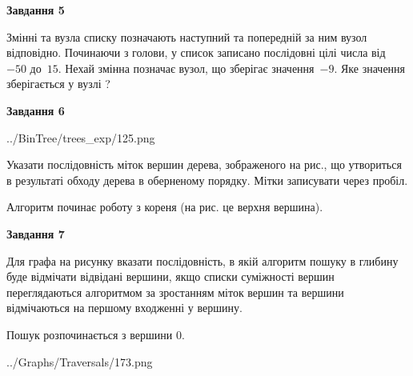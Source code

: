 \documentclass[12pt, ukrainian]{article}
\begin{document}
{\begin {large}
{\begin {center}\textbf{Завдання 5}\end {center}}\par
Змінні  та  вузла списку позначають наступний та попередній за ним вузол відповідно. Починаючи з голови, у список записано послідовні цілі числа від~$-50$ до~$15$. Нехай змінна  позначає вузол, що зберігає значення~$-9$.
Яке значення зберігається у вузлі  ?\par
\newpage

{\begin {center}\textbf{Завдання 6}\end {center}}\par

\begin{center}
	{../BinTree/trees_exp/125.png}
\end{center}
Указати послідовність міток вершин дерева, зображеного на рис., що утвориться в результаті обходу дерева в оберненому порядку. Мітки записувати через пробіл.\par Алгоритм починає роботу з кореня (на рис. це верхня вершина).\par
\newpage

{\begin {center}\textbf{Завдання 7}\end {center}}\par
Для графа на рисунку вказати послідовність, в якій алгоритм пошуку в глибину буде відмічати відвідані вершини, якщо списки суміжності вершин переглядаються алгоритмом за зростанням міток вершин та вершини відмічаються на першому вход\-женні у вершину.\par
Пошук розпочинається з вершини 0.\par

\begin{center}
	{../Graphs/Traversals/173.png}
\end{center}\par
\newpage


\end{large}}
\end{document}

